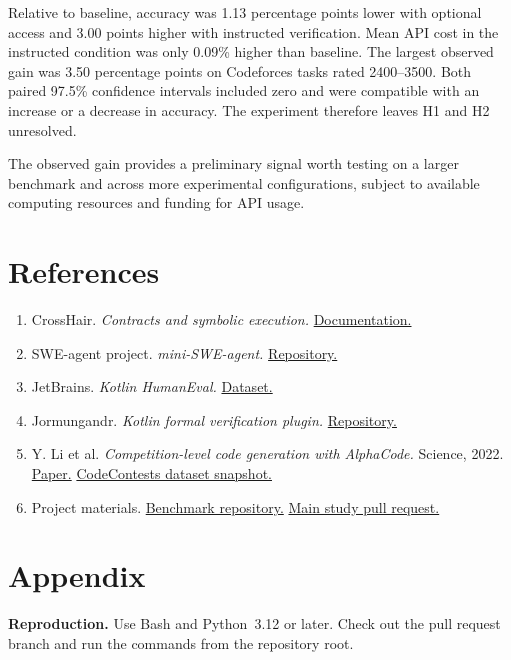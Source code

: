 \documentclass[11pt,a4paper]{article}
\begin{document}
Relative to baseline, accuracy was 1.13 percentage points lower with optional access and 3.00 points higher with instructed verification. Mean API cost in the instructed condition was only 0.09\% higher than baseline. The largest observed gain was 3.50 percentage points on Codeforces tasks rated 2400--3500. Both paired 97.5\% confidence intervals included zero and were compatible with an increase or a decrease in accuracy. The experiment therefore leaves H1 and H2 unresolved.

The observed gain provides a preliminary signal worth testing on a larger benchmark and across more experimental configurations, subject to available computing resources and funding for API usage.

\section{References}
\begin{enumerate}
\setlength{\itemsep}{4pt}
\item\label{ref:crosshair} CrossHair. \emph{Contracts and symbolic execution.} \href{https://crosshair.readthedocs.io/en/latest/contracts.html}{Documentation.}
\item\label{ref:mini} SWE-agent project. \emph{mini-SWE-agent.} \href{https://github.com/SWE-agent/mini-swe-agent}{Repository.}
\item\label{ref:humaneval} JetBrains. \emph{Kotlin HumanEval.} \href{https://huggingface.co/datasets/JetBrains/Kotlin_HumanEval}{Dataset.}
\item\label{ref:jormungandr} Jormungandr. \emph{Kotlin formal verification plugin.} \href{https://github.com/korrektness/jormungandr}{Repository.}
\item\label{ref:codecontests} Y. Li et al. \emph{Competition-level code generation with AlphaCode.} Science, 2022. \href{https://doi.org/10.1126/science.abq1158}{Paper.} \href{https://huggingface.co/datasets/deepmind/code_contests/tree/802411c3010cb00d1b05bad57ca77365a3c699d6}{CodeContests dataset snapshot.}
\item\label{ref:project} Project materials. \href{https://github.com/dimativator/plsd-verifier-project/tree/3e0232b9458f0681853c1f4cbed76878b6ab2abe}{Benchmark repository.} \href{https://github.com/dimativator/plsd-verifier-project/pull/1}{Main study pull request.}
\end{enumerate}

\section{Appendix}
\textbf{Reproduction.} Use Bash and Python~3.12 or later. Check out the pull request branch and run the commands from the repository root.
\end{document}
